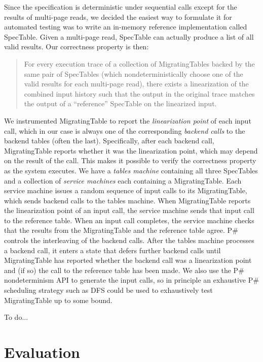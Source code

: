 \documentclass{sig-alternate}
\newcommand{\psharp}{P\#\xspace}
\begin{document}
Since the specification is deterministic under sequential calls except for the results of multi-page reads, we decided the easiest way to formulate it for automated testing was to write an in-memory reference implementation called SpecTable.  Given a multi-page read, SpecTable can actually produce a list of all valid results.  Our correctness property is then:
\begin{quote}
For every execution trace of a collection of MigratingTables backed by the same pair of SpecTables (which nondeterministically choose one of the valid results for each multi-page read), there exists a linearization of the combined input history such that the output in the original trace matches the output of a ``reference'' SpecTable on the linearized input.
\end{quote}
%
\def\term#1{\emph{#1}}
We instrumented MigratingTable to report the \term{linearization point} of each input call, which in our case is always one of the corresponding \term{backend calls} to the backend tables (often the last).  Specifically, after each backend call, MigratingTable reports whether it was the linearization point, which may depend on the result of the call.  This makes it possible to verify the correctness property as the system executes.  We have a \term{tables machine} containing all three SpecTables and a collection of \term{service machines} each containing a MigratingTable.  Each service machine issues a random sequence of input calls to its MigratingTable, which sends backend calls to the tables machine.  When MigratingTable reports the linearization point of an input call, the service machine sends that input call to the reference table.  When an input call completes, the service machine checks that the results from the MigratingTable and the reference table agree.  \psharp controls the interleaving of the backend calls.  After the tables machine processes a backend call, it enters a state that defers further backend calls until MigratingTable has reported whether the backend call was a linearization point and (if so) the call to the reference table has been made.  We also use the \psharp nondeterminism API to generate the input calls, so in principle an exhaustive \psharp scheduling strategy such as DFS could be used to exhaustively test MigratingTable up to some bound.

To do...

\section{Evaluation}
\label{sec:eval}
\end{document}
